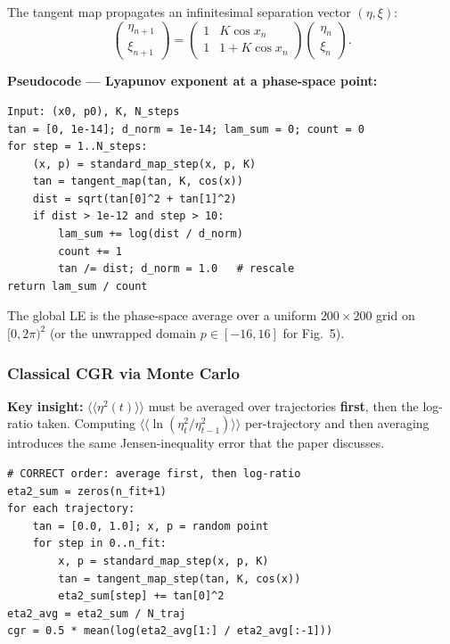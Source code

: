 \documentclass[11pt,a4paper]{article}
\newcommand{\avg}[1]{\langle\!\langle #1 \rangle\!\rangle}
\begin{document}
The tangent map propagates an infinitesimal separation vector $(\eta,\xi)$:
\begin{equation}\label{eq:tangent}
\begin{pmatrix}\eta_{n+1}\\\xi_{n+1}\end{pmatrix}
=\begin{pmatrix}1 & K\cos x_{n}\\ 1 & 1+K\cos x_{n}\end{pmatrix}
\begin{pmatrix}\eta_{n}\\\xi_{n}\end{pmatrix}.
\end{equation}

\noindent\textbf{Pseudocode --- Lyapunov exponent at a phase-space point:}
\begin{lstlisting}
Input: (x0, p0), K, N_steps
tan = [0, 1e-14]; d_norm = 1e-14; lam_sum = 0; count = 0
for step = 1..N_steps:
    (x, p) = standard_map_step(x, p, K)
    tan = tangent_map(tan, K, cos(x))
    dist = sqrt(tan[0]^2 + tan[1]^2)
    if dist > 1e-12 and step > 10:
        lam_sum += log(dist / d_norm)
        count += 1
        tan /= dist; d_norm = 1.0   # rescale
return lam_sum / count
\end{lstlisting}

\noindent The global LE is the phase-space average over a uniform $200\times200$ grid on $[0,2\pi)^{2}$ (or the unwrapped domain $p\in[-16,16]$ for Fig.~5).

\subsubsection*{Classical CGR via Monte Carlo}

\textbf{Key insight:} $\avg{\eta^{2}(t)}$ must be averaged over trajectories \textbf{first}, then the log-ratio taken. Computing $\avg{\ln(\eta^{2}_{t}/\eta^{2}_{t-1})}$ per-trajectory and then averaging introduces the same Jensen-inequality error that the paper discusses.

\begin{lstlisting}
# CORRECT order: average first, then log-ratio
eta2_sum = zeros(n_fit+1)
for each trajectory:
    tan = [0.0, 1.0]; x, p = random point
    for step in 0..n_fit:
        x, p = standard_map_step(x, p, K)
        tan = tangent_map_step(tan, K, cos(x))
        eta2_sum[step] += tan[0]^2
eta2_avg = eta2_sum / N_traj
cgr = 0.5 * mean(log(eta2_avg[1:] / eta2_avg[:-1]))
\end{lstlisting}
\end{document}

